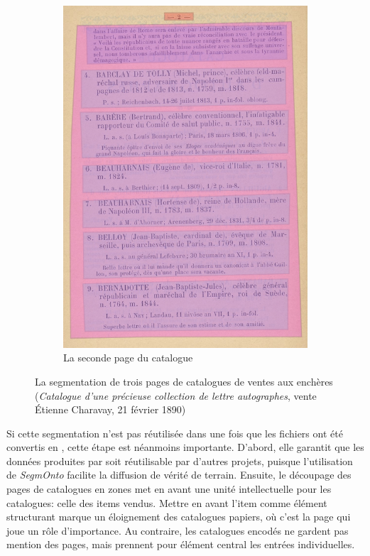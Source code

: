 \begin{figure}
\begin{subfigure}{0.33\textwidth}
		\includegraphics[width=\textwidth]{img/cat_000434_p2_zones.png}
		\caption{La seconde page du catalogue}
		\label{fig:catp2}
	\end{subfigure}
	\caption{La segmentation de trois pages de catalogues de ventes aux enchères (\textit{Catalogue d'une précieuse collection de lettre autographes}, vente Étienne Charavay, 21 février 1890)}
	\label{fig:catzones}
\end{figure}

Si cette segmentation n'est pas réutilisée dans une fois que les fichiers \alto{} ont été convertis en \tei{}, cette étape est néanmoins importante. D'abord, elle garantit que les données produites par \mssktb{} soit réutilisable par d'autres projets, puisque l'utilisation de \textit{SegmOnto} facilite la diffusion de vérité de terrain. Ensuite, le découpage des pages de catalogues en zones met en avant une unité intellectuelle pour les catalogues: celle des items vendus. Mettre en avant l'item comme élément structurant marque un éloignement des catalogues papiers, où c'est la page qui joue un rôle d'importance. Au contraire, les catalogues encodés ne gardent pas mention des pages, mais prennent pour élément central les entrées individuelles.


